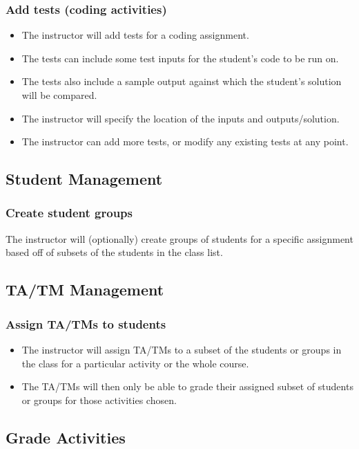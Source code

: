 \documentclass{article}
\begin{document}
\subsubsection{Add tests (coding activities) \label{addTests}}
\begin{itemize}
	\item The instructor will add tests for a coding assignment.
	\item The tests can include some test inputs for the student's code to be run on.
	\item The tests also include a sample output against which the student's solution
		will be compared.
	\item The instructor will specify the location of the inputs and outputs/solution.
	\item The instructor can add more tests, or modify any existing tests at any point.
\end{itemize}

\subsection{Student Management}
\subsubsection{Create student groups}
The instructor will (optionally) create groups of students for a specific assignment
based off of subsets of the students in the class list.
\subsection{TA/TM Management}
\subsubsection{Assign TA/TMs to students \label{AssignTA}}
\begin{itemize}
	\item The instructor will assign TA/TMs to a subset of the students or groups in the class
		for a particular activity or the whole course.
	\item The TA/TMs will then only be able to grade their assigned subset of students
		or groups for those activities chosen.
\end{itemize}

\subsection{Grade Activities \label{grading}}
\end{document}
